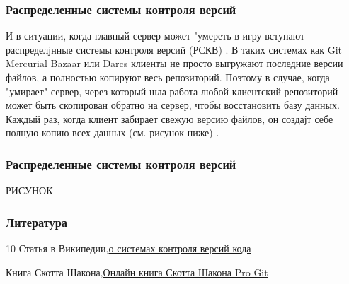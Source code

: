 \documentclass[14pt]{beamer}
\begin{document}
\begin{frame}
	\frametitle{Распределенные системы контроля версий}
	
{\scriptsize 	И в ситуации, когда главный сервер может "умереть в игру вступают распределјнные системы контроля версий (РСКВ) .
	В таких системах как Git Mercurial Bazaar или Darcs клиенты не просто выгружают последние версии файлов, а полностью копируют весь репозиторий. Поэтому в случае, когда "умирает" сервер, через который шла работа любой клиентский репозиторий может быть скопирован обратно на сервер, чтобы восстановить базу данных. Каждый раз, когда клиент забирает свежую версию файлов, он создајт себе полную копию всех данных (см. рисунок ниже) .
}
\end{frame}

\begin{frame}
	\frametitle{Распределенные системы контроля версий}
	РИСУНОК
\end{frame}

\begin{frame}
	\frametitle{Литература}
	\begin {thebibliography}{10}
	{\sc Статья в Википедии},{\href{https://ru.wikipedia.org/wiki/Система_управления_версиями}{о системах контроля версий кода}}
	
	{\sc Книга Скотта Шакона},{\href{https://git-scm.com/book/en/v2}{Онлайн книга Скотта Шакона Pro Git}}
	\end {thebibliography}
\end{frame}
\end{document}
